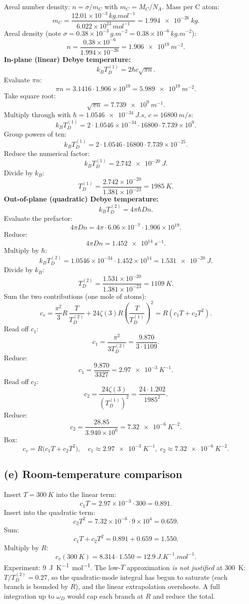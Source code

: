 \documentclass[11pt]{article}
\begin{document}
Areal number density: $n = \sigma/m_C$ with $m_C = M_C/N_A$. Mass per C atom:
\[
m_C = \frac{12.01\times 10^{-3}\,\si{kg.mol^{-1}}}{6.022\times 10^{23}\,\si{mol^{-1}}} = \SI{1.994e-26}{kg}.
\]
Areal density (note $\sigma = 0.38\times 10^{-3}\,\si{g.m^{-2}} = 0.38\times 10^{-6}\,\si{kg.m^{-2}}$):
\[
n = \frac{0.38\times 10^{-6}}{1.994\times 10^{-26}} = \SI{1.906e19}{m^{-2}}.
\]
\textbf{In-plane (linear) Debye temperature:}
\[
k_B T_D^{(1)} = 2\hbar c\sqrt{\pi n}.
\]
Evaluate $\pi n$:
\[
\pi n = 3.1416\cdot 1.906\times 10^{19} = \SI{5.989e19}{m^{-2}}.
\]
Take square root:
\[
\sqrt{\pi n} = \SI{7.739e9}{m^{-1}}.
\]
Multiply through with $\hbar = \SI{1.0546e-34}{J.s}$, $c = \SI{16800}{m/s}$:
\[
k_B T_D^{(1)} = 2\cdot 1.0546\times 10^{-34}\cdot 16800\cdot 7.739\times 10^{9}.
\]
Group powers of ten:
\[
k_B T_D^{(1)} = 2\cdot 1.0546\cdot 16800\cdot 7.739\times 10^{-25}.
\]
Reduce the numerical factor:
\[
k_B T_D^{(1)} = \SI{2.742e-20}{J}.
\]
Divide by $k_B$:
\[
T_D^{(1)} = \frac{2.742\times 10^{-20}}{1.381\times 10^{-23}} = \SI{1985}{K}.
\]
\textbf{Out-of-plane (quadratic) Debye temperature:}
\[
k_B T_D^{(2)} = 4\pi\hbar D n.
\]
Evaluate the prefactor:
\[
4\pi D n = 4\pi\cdot 6.06\times 10^{-7}\cdot 1.906\times 10^{19}.
\]
Reduce:
\[
4\pi D n = \SI{1.452e14}{s^{-1}}.
\]
Multiply by $\hbar$:
\[
k_B T_D^{(2)} = 1.0546\times 10^{-34}\cdot 1.452\times 10^{14} = \SI{1.531e-20}{J}.
\]
Divide by $k_B$:
\[
T_D^{(2)} = \frac{1.531\times 10^{-20}}{1.381\times 10^{-23}} = \SI{1109}{K}.
\]
Sum the two contributions (one mole of atoms):
\[
c_v = \frac{\pi^2}{3}R\,\frac{T}{T_D^{(2)}} + 24\zeta(3) R\!\left(\frac{T}{T_D^{(1)}}\right)^2 = R(c_1 T + c_2 T^2).
\]
Read off $c_1$:
\[
c_1 = \frac{\pi^2}{3 T_D^{(2)}} = \frac{9.870}{3\cdot 1109}.
\]
Reduce:
\[
c_1 = \frac{9.870}{3327} = \SI{2.97e-3}{K^{-1}}.
\]
Read off $c_2$:
\[
c_2 = \frac{24\zeta(3)}{(T_D^{(1)})^2} = \frac{24\cdot 1.202}{1985^2}.
\]
Reduce:
\[
c_2 = \frac{28.85}{3.940\times 10^{6}} = \SI{7.32e-6}{K^{-2}}.
\]
Box:
\[
\boxed{\;c_v = R\bigl(c_1 T + c_2 T^2\bigr),\quad c_1 \approx \SI{2.97e-3}{K^{-1}},\;c_2\approx \SI{7.32e-6}{K^{-2}}.\;}
\]

\subsection*{(e) Room-temperature comparison}

Insert $T = \SI{300}{K}$ into the linear term:
\[
c_1 T = 2.97\times 10^{-3}\cdot 300 = 0.891.
\]
Insert into the quadratic term:
\[
c_2 T^2 = 7.32\times 10^{-6}\cdot 9\times 10^{4} = 0.659.
\]
Sum:
\[
c_1 T + c_2 T^2 = 0.891 + 0.659 = 1.550.
\]
Multiply by $R$:
\[
c_v(\SI{300}{K}) = 8.314\cdot 1.550 = \SI{12.9}{J.K^{-1}.mol^{-1}}.
\]
Experiment: \SI{9}{J.K^{-1}.mol^{-1}}. The low-$T$ approximation \emph{is not justified} at \SI{300}{K}: $T/T_D^{(2)} = 0.27$, so the quadratic-mode integral has begun to saturate (each branch is bounded by $R$), and the linear extrapolation overshoots. A full integration up to $\omega_D$ would cap each branch at $R$ and reduce the total.
\end{document}
